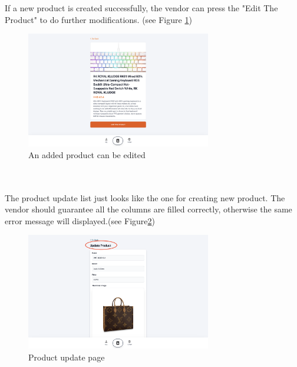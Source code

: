 \documentclass{article}
\begin{document}
\\\\
If a new product is created successfully, the vendor can press the "Edit The Product" to do further modifications. (see Figure \ref{fig:successfully create})
\begin{figure}[!htp]
    \centering
    \includegraphics[width=0.72\textwidth]{create successfully.png}
    \caption{\label{fig:successfully create}An added product can be edited}
\end{figure}
\newpage
\leavevmode
\\\\
The product update list just looks like the one for creating new product. The vendor should guarantee all the columns are filled correctly, otherwise the same error message will displayed.(see Figure\ref{fig:Product update page})
\begin{figure}[htbp]
    \centering
    \includegraphics[width=0.72\textwidth]{modification.png}
    \caption{\label{fig:Product update page}Product update page}
\end{figure}
\end{document}
